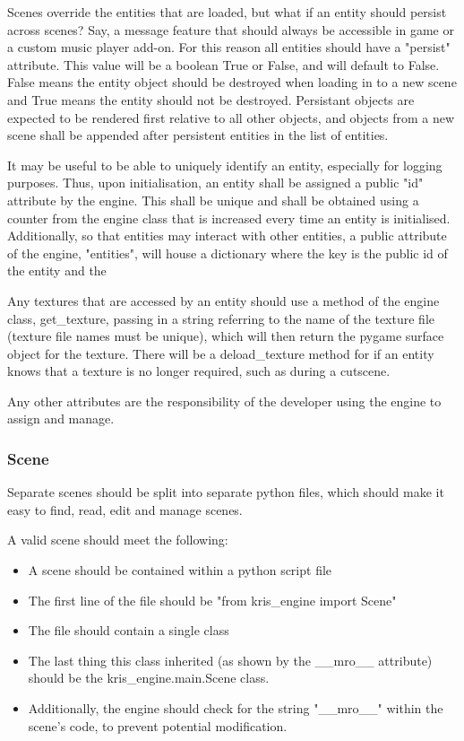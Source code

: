 \documentclass{report}
\begin{document}
Scenes override the entities that are loaded, but what if an entity should persist across scenes? Say, a message feature that should always be accessible in game or a custom music player add-on. For this reason all entities should have a "persist" attribute. This value will be a boolean True or False, and will default to False. False means the entity object should be destroyed when loading in to a new scene and True means the entity should not be destroyed. Persistant objects are expected to be rendered first relative to all other objects, and objects from a new scene shall be appended after persistent entities in the list of entities.

It may be useful to be able to uniquely identify an entity, especially for logging purposes. Thus, upon initialisation, an entity shall be assigned a public "id" attribute by the engine. This shall be unique and shall be obtained using a counter from the engine class that is increased every time an entity is initialised. Additionally, so that entities may interact with other entities, a public attribute of the engine, "entities", will house a dictionary where the key is the public id of the entity and the 

Any textures that are accessed by an entity should use a method of the engine class, get\_texture, passing in a string referring to the name of the texture file (texture file names must be unique), which will then return the pygame surface object for the texture. There will be a deload\_texture method for if an entity knows that a texture is no longer required, such as during a cutscene.

Any other attributes are the responsibility of the developer using the engine to assign and manage.

\subsubsection{Scene}

Separate scenes should be split into separate python files, which should make it easy to find, read, edit and manage scenes. 

A valid scene should meet the following:

\begin{itemize}
\renewcommand\labelitemi{--}
    \item A scene should be contained within a python script file
    \item The first line of the file should be "from kris\_engine import Scene"
    \item The file should contain a single class
    \item The last thing this class inherited (as shown by the \_\_mro\_\_ attribute) should be the kris\_engine.main.Scene class.
    \item Additionally, the engine should check for the string "\_\_mro\_\_" within the scene's code, to prevent potential modification.
\end{itemize}
\end{document}
